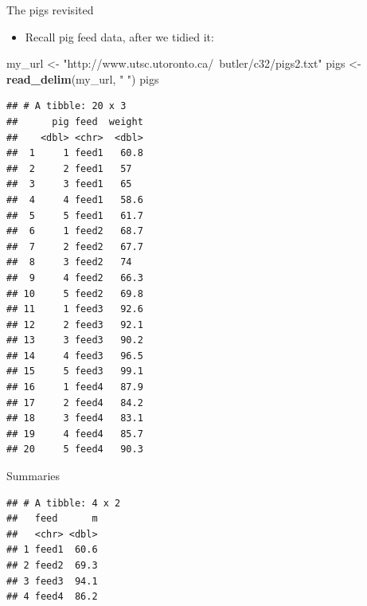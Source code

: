 \documentclass[
  ignorenonframetext,
]{beamer}
\newenvironment{Shaded}{\begin{snugshade}}{\end{snugshade}}
\newcommand{\DataTypeTok}[1]{\textcolor[rgb]{0.13,0.29,0.53}{#1}}
\newcommand{\KeywordTok}[1]{\textcolor[rgb]{0.13,0.29,0.53}{\textbf{#1}}}
\newcommand{\NormalTok}[1]{#1}
\newcommand{\OperatorTok}[1]{\textcolor[rgb]{0.81,0.36,0.00}{\textbf{#1}}}
\newcommand{\StringTok}[1]{\textcolor[rgb]{0.31,0.60,0.02}{#1}}
\providecommand{\tightlist}{%
  \setlength{\itemsep}{0pt}\setlength{\parskip}{0pt}}
\begin{document}
\begin{frame}[fragile]{The pigs revisited}
\protect\hypertarget{the-pigs-revisited}{}

\begin{itemize}
\tightlist
\item
  Recall pig feed data, after we tidied it:
\end{itemize}

\begin{Shaded}
\begin{Highlighting}[]
\NormalTok{my_url <-}\StringTok{ "http://www.utsc.utoronto.ca/~butler/c32/pigs2.txt"}
\NormalTok{pigs <-}\StringTok{ }\KeywordTok{read_delim}\NormalTok{(my_url, }\StringTok{" "}\NormalTok{)}
\NormalTok{pigs }
\end{Highlighting}
\end{Shaded}

\begin{verbatim}
## # A tibble: 20 x 3
##      pig feed  weight
##    <dbl> <chr>  <dbl>
##  1     1 feed1   60.8
##  2     2 feed1   57  
##  3     3 feed1   65  
##  4     4 feed1   58.6
##  5     5 feed1   61.7
##  6     1 feed2   68.7
##  7     2 feed2   67.7
##  8     3 feed2   74  
##  9     4 feed2   66.3
## 10     5 feed2   69.8
## 11     1 feed3   92.6
## 12     2 feed3   92.1
## 13     3 feed3   90.2
## 14     4 feed3   96.5
## 15     5 feed3   99.1
## 16     1 feed4   87.9
## 17     2 feed4   84.2
## 18     3 feed4   83.1
## 19     4 feed4   85.7
## 20     5 feed4   90.3
\end{verbatim}

\end{frame}

\begin{frame}[fragile]{Summaries}
\protect\hypertarget{summaries}{}

\begin{Shaded}
\end{Shaded}

\begin{verbatim}
## # A tibble: 4 x 2
##   feed      m
##   <chr> <dbl>
## 1 feed1  60.6
## 2 feed2  69.3
## 3 feed3  94.1
## 4 feed4  86.2
\end{verbatim}

\end{frame}
\end{document}

